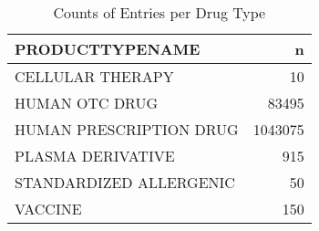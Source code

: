 \documentclass[
]{article}
\newenvironment{Shaded}{\begin{snugshade}}{\end{snugshade}}
\newcommand{\DataTypeTok}[1]{\textcolor[rgb]{0.13,0.29,0.53}{#1}}
\newcommand{\KeywordTok}[1]{\textcolor[rgb]{0.13,0.29,0.53}{\textbf{#1}}}
\newcommand{\NormalTok}[1]{#1}
\newcommand{\OperatorTok}[1]{\textcolor[rgb]{0.81,0.36,0.00}{\textbf{#1}}}
\newcommand{\StringTok}[1]{\textcolor[rgb]{0.31,0.60,0.02}{#1}}
\begin{document}
\begin{table}

\caption{\label{tab:unnamed-chunk-5}Counts of Entries per Drug Type}
\centering
\begin{tabular}[t]{l|r}
\hline
PRODUCTTYPENAME & n\\
\hline
CELLULAR THERAPY & 10\\
\hline
HUMAN OTC DRUG & 83495\\
\hline
HUMAN PRESCRIPTION DRUG & 1043075\\
\hline
PLASMA DERIVATIVE & 915\\
\hline
STANDARDIZED ALLERGENIC & 50\\
\hline
VACCINE & 150\\
\hline
\end{tabular}
\end{table}

\begin{Shaded}
\end{Shaded}
\end{document}
